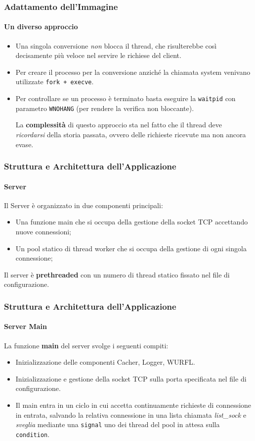 \documentclass{beamer}
\begin{document}
\begin{frame}
\frametitle{Adattamento dell'Immagine}
\framesubtitle{Un diverso approccio}

\begin{itemize}
\item Una singola conversione \textit{non} blocca il thread, che risulterebbe così decisamente più
veloce nel servire le richiese del client.
\item Per creare il processo per la conversione anziché la chiamata system venivano
utilizzate \texttt{fork + execve}.
\item Per controllare se un processo è terminato basta eseguire la \texttt{waitpid} con parametro
\texttt{WNOHANG} (per rendere la verifica non bloccante).

\medskip

La \textbf{complessità} di questo approccio sta nel fatto che il thread deve \textit{ricordarsi} della storia passata, ovvero delle richieste ricevute ma non ancora evase.
\end{itemize}
\end{frame}



\begin{frame}
\frametitle{Struttura e Architettura dell'Applicazione}
\framesubtitle{Server}

Il Server è organizzato in due componenti principali:
\begin{itemize}
\item Una funzione main che si occupa della gestione della socket TCP
accettando nuove connessioni;
\item Un pool statico di thread worker che si occupa della gestione di ogni
singola connessione;
\end{itemize}


Il server è \textbf{prethreaded} con  un numero di thread statico fissato nel file di configurazione.


\medskip
\end{frame}

\begin{frame}
\frametitle{Struttura e Architettura dell'Applicazione}
\framesubtitle{Server Main}
La funzione \textbf{main} del server svolge i seguenti compiti:

\medskip

\begin{itemize}
\item Inizializzazione delle componenti Cacher, Logger, WURFL.
\item Inizializzazione e gestione della socket TCP sulla porta specificata nel file di configurazione.
\item Il main entra in un ciclo in cui accetta continuamente richieste di connessione in entrata, salvando la relativa connessione in una lista chiamata \textit{list\_sock} e \textit{sveglia} mediante una \texttt{signal} uno dei thread del pool in attesa sulla \texttt{condition}.
\end{itemize}

\end{frame}
\end{document}
